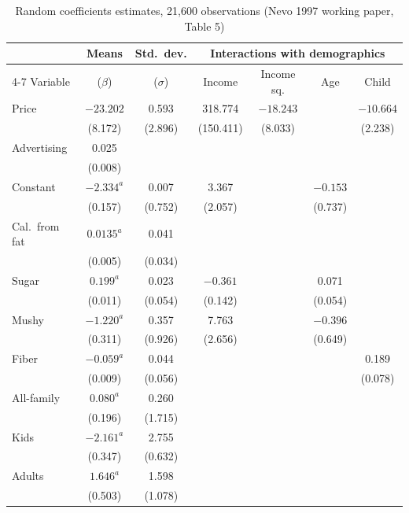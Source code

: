 \begin{table}[htbp]
\centering
\caption{Random coefficients estimates, 21,600 observations (Nevo 1997 working paper, Table 5)}
\label{tab:11-nevo-rc}
\small
\setlength{\tabcolsep}{4.5pt}
\begin{tabular}{@{}lcccccc@{}}
\toprule
 & Means & Std.\ dev. & \multicolumn{4}{c}{Interactions with demographics} \\
\cmidrule(lr){4-7}
Variable & ($\beta$) & ($\sigma$) & Income & Income sq. & Age & Child \\
\midrule
Price          & $-23.202$  & 0.593   & 318.774   & $-18.243$ &           & $-10.664$ \\
               & (8.172)    & (2.896) & (150.411) & (8.033)   &           & (2.238)   \\
Advertising    & 0.025      &         &           &           &           &           \\
               & (0.008)    &         &           &           &           &           \\
Constant       & $-2.334^{a}$ & 0.007 & 3.367     &           & $-0.153$  &           \\
               & (0.157)    & (0.752) & (2.057)   &           & (0.737)   &           \\
Cal.\ from fat & $0.0135^{a}$ & 0.041 &           &           &           &           \\
               & (0.005)    & (0.034) &           &           &           &           \\
Sugar          & $0.199^{a}$ & 0.023  & $-0.361$  &           & 0.071     &           \\
               & (0.011)    & (0.054) & (0.142)   &           & (0.054)   &           \\
Mushy          & $-1.220^{a}$ & 0.357 & 7.763     &           & $-0.396$  &           \\
               & (0.311)    & (0.926) & (2.656)   &           & (0.649)   &           \\
Fiber          & $-0.059^{a}$ & 0.044 &           &           &           & 0.189     \\
               & (0.009)    & (0.056) &           &           &           & (0.078)   \\
All-family     & $0.080^{a}$ & 0.260  &           &           &           &           \\
               & (0.196)    & (1.715) &           &           &           &           \\
Kids           & $-2.161^{a}$ & 2.755 &           &           &           &           \\
               & (0.347)    & (0.632) &           &           &           &           \\
Adults         & $1.646^{a}$ & 1.598  &           &           &           &           \\
               & (0.503)    & (1.078) &           &           &           &           \\
\bottomrule
\end{tabular}


\end{table}
